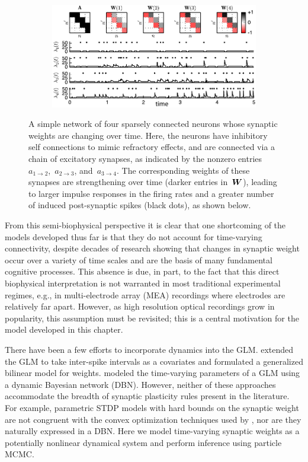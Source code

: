 \begin{figure}[t!]
  \centering
  \begin{subfigure}[T]{5.25in}
    \includegraphics[width=\textwidth]{figures/ch6/figure1}    
  \end{subfigure}
  \caption[A simple example of a GLM with time-varying synaptic weights]{
    A simple network of four sparsely connected neurons whose
    synaptic weights are changing over time. Here, the neurons have
    inhibitory self connections to mimic refractory effects, and are
    connected via a chain of excitatory synapses, as indicated by the
    nonzero entries~$a_{1\to 2}$,~$a_{2 \to 3}$, and~$a_{3\to 4}$. The
    corresponding weights of these synapses are strengthening over time
    (darker entries in~$\boldsymbol{W}$), leading to larger impulse responses in
    the firing rates and a greater number of induced post-synaptic
    spikes (black dots), as shown below.}
  \label{fig:model_illustration}
\end{figure}

From this semi-biophysical perspective it is clear that one
shortcoming of the models developed thus far is that they do not
account for time-varying connectivity, despite decades of research
showing that changes in synaptic weight occur over a variety of time
scales and are the basis of many fundamental cognitive processes. This
absence is due, in part, to the fact that this direct biophysical
interpretation is not warranted in most traditional experimental
regimes, e.g., in multi-electrode array (MEA) recordings where
electrodes are relatively far apart.  However, as high resolution
optical recordings grow in popularity, this assumption must be
revisited; this is a central motivation for the model developed
in this chapter.

There have been a few efforts to incorporate dynamics into the
GLM. \citet{Stevenson-2011} extended the GLM to take inter-spike
intervals as a covariates and formulated a generalized bilinear model
for weights. \citet{Eldawlatly-2010} modeled the time-varying
parameters of a GLM using a dynamic Bayesian network (DBN). However,
neither of these approaches accommodate the breadth of synaptic
plasticity rules present in the literature. For example, parametric
STDP models with hard bounds on the synaptic weight are not congruent
with the convex optimization techniques used by \citep{Stevenson-2011},
nor are they naturally expressed in a DBN. Here we model time-varying
synaptic weights as a potentially nonlinear dynamical system and
perform inference using particle MCMC.

